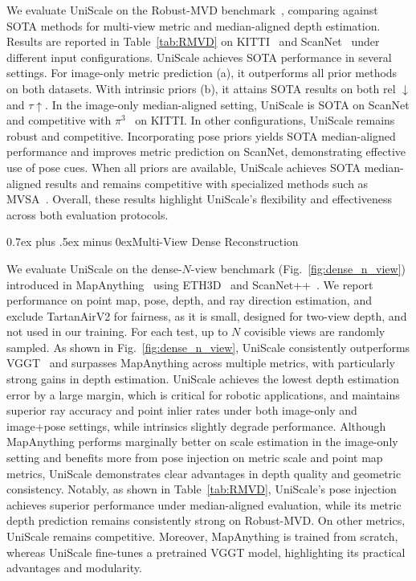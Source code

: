 \documentclass[letterpaper, 10 pt, conference]{ieeeconf}  %
\makeatletter
\renewcommand{\subsection}{\@startsection{subsection}{2}{\z@}{1.5ex plus 1.5ex minus 0.5ex}%
{0.7ex plus .5ex minus 0ex}{\normalfont\normalsize\bfseries}}
\makeatother
\begin{document}
We evaluate UniScale on the Robust-MVD benchmark~\cite{schroppel2022benchmark}, comparing against SOTA methods for multi-view metric and median-aligned depth estimation. Results are reported in Table~\ref{tab:RMVD} on KITTI~\cite{geiger2013vision} and ScanNet~\cite{dai2017scannet} under different input configurations.
UniScale achieves SOTA performance in several settings. For image-only metric prediction (a), it outperforms all prior methods on both datasets. With intrinsic priors (b), it attains SOTA results on both rel $\downarrow$ and $\tau \uparrow$. In the image-only median-aligned setting, UniScale is SOTA on ScanNet and competitive with $\pi^3$~\cite{keetha2025mapanything} on KITTI.
In other configurations, UniScale remains robust and competitive. Incorporating pose priors yields SOTA median-aligned performance and improves metric prediction on ScanNet, demonstrating effective use of pose cues. When all priors are available, UniScale achieves SOTA median-aligned results and remains competitive with specialized methods such as MVSA~\cite{izquierdo2025mvsanywhere}. Overall, these results highlight UniScale’s flexibility and effectiveness across both evaluation protocols.

\subsection{Multi-View Dense Reconstruction}

We evaluate UniScale on the dense-$N$-view benchmark (Fig.~\ref{fig:dense_n_view}) introduced in MapAnything~\cite{keetha2025mapanything} using ETH3D~\cite{schops:etal:CVPR2017} and ScanNet++~\cite{dai2017scannet}. We report performance on point map, pose, depth, and ray direction estimation, and exclude TartanAirV2 for fairness, as it is small, designed for two-view depth, and not used in our training.
For each test, up to $N$ covisible views are randomly sampled. As shown in Fig.~\ref{fig:dense_n_view}, UniScale consistently outperforms VGGT~\cite{wang2025vggt} and surpasses MapAnything across multiple metrics, with particularly strong gains in depth estimation. UniScale achieves the lowest depth estimation error by a large margin, which is critical for robotic applications, and maintains superior ray accuracy and point inlier rates under both image-only and image+pose settings, while intrinsics slightly degrade performance. Although MapAnything performs marginally better on scale estimation in the image-only setting and benefits more from pose injection on metric scale and point map metrics, UniScale demonstrates clear advantages in depth quality and geometric consistency. Notably, as shown in Table~\ref{tab:RMVD}, UniScale’s pose injection achieves superior performance under median-aligned evaluation, while its metric depth prediction remains consistently strong on Robust-MVD. On other metrics, UniScale remains competitive. Moreover, MapAnything is trained from scratch, whereas UniScale fine-tunes a pretrained VGGT model, highlighting its practical advantages and modularity.
\end{document}
